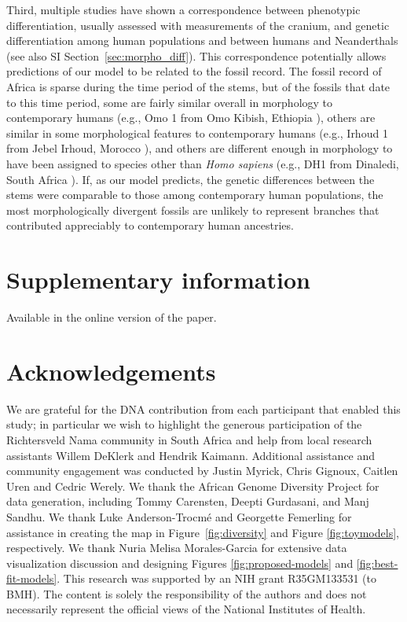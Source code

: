 \documentclass[]{article}
\begin{document}
Third, multiple studies have shown a correspondence between phenotypic
differentiation, usually assessed with measurements of the cranium, and genetic
differentiation among human populations and between humans and Neanderthals
\citep{Relethford1994-mh,Weaver2008-ho,Von_Cramon-Taubadel2009-zb} (see also SI
Section~\ref{sec:morpho_diff}). This correspondence potentially allows
predictions of our model to be related to the fossil record. The fossil record
of Africa is sparse during the time period of the stems, but of the fossils
that date to this time period, some are fairly similar overall in morphology to
contemporary humans (e.g., Omo 1 from Omo Kibish, Ethiopia
\citep{Day1969-rh,Vidal2022-qe}), others are similar in some morphological
features to contemporary humans (e.g., Irhoud 1 from Jebel Irhoud, Morocco
\citep{Hublin2017-cq,Richter2017-zu}), and others are different enough in
morphology to have been assigned to species other than \emph{Homo sapiens}
(e.g., DH1 from Dinaledi, South Africa \citep{Berger2015-bq,Dirks2017-uk}). If,
as our model predicts, the genetic differences between the stems were
comparable to those among contemporary human populations, the most
morphologically divergent fossils are unlikely to represent branches that
contributed appreciably to contemporary human ancestries.




\section*{Supplementary information}
Available in the online version of the paper.

\section*{Acknowledgements}

We are grateful for the DNA contribution from each participant that enabled
this study; in particular we wish to highlight the generous participation of
the Richtersveld Nama community in South Africa and help from local research
assistants Willem DeKlerk and Hendrik Kaimann. Additional assistance and
community engagement was conducted by Justin Myrick, Chris Gignoux, Caitlen
Uren and Cedric Werely. We thank the African Genome Diversity Project for data
generation, including Tommy Carensten, Deepti Gurdasani, and Manj Sandhu. We
thank Luke Anderson-Trocm\'e and Georgette Femerling for assistance in creating
the map in Figure~\ref{fig:diversity} and Figure \ref{fig:toymodels},
respectively. We thank Nuria Melisa Morales-Garcia for extensive data
visualization discussion and designing Figures \ref{fig:proposed-models} and
\ref{fig:best-fit-models}. This research was supported by an NIH grant
R35GM133531 (to BMH). The content is solely the responsibility of the authors
and does not necessarily represent the official views of the National
Institutes of Health.
\end{document}
